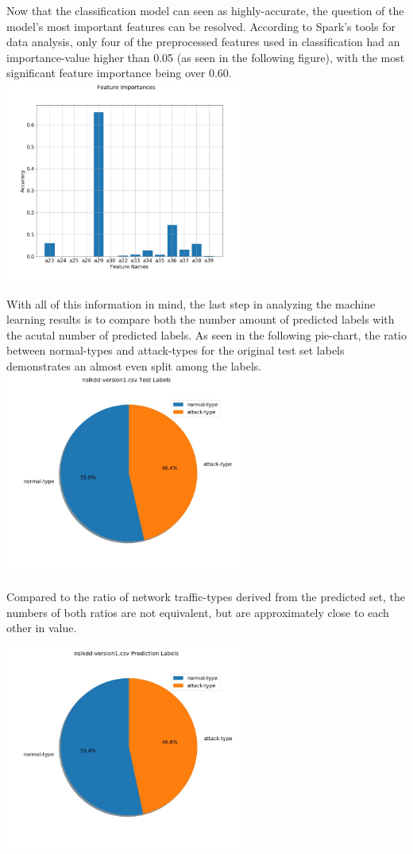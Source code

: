 \documentclass[a4paper,12pt]{IEEEtran}
\begin{document}
Now that the classification model can seen as highly-accurate, the question of the model's most important features can be resolved. According to Spark's tools for data analysis, only four of the preprocessed features used in classification had an importance-value higher than 0.05 (as seen in the following figure), with the most significant feature importance being over 0.60.
\includegraphics[width=8cm]{v1_feature_importances}

With all of this information in mind, the last step in analyzing the machine learning results is to compare both the number amount of predicted labels with the acutal number of predicted labels. As seen in the following pie-chart, the ratio between normal-types and attack-types for the original test set labels demonstrates an almost even split among the labels.
\includegraphics[width=8cm]{v1_test_pie}

Compared to the ratio of network traffic-types derived from the predicted set, the numbers of both ratios are not equivalent, but are approximately close to each other in value.

\includegraphics[width=8cm]{v1_pred_pie}
\end{document}
